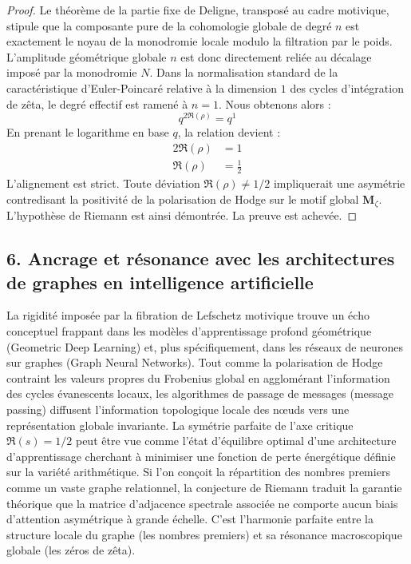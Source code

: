 \documentclass[
]{article}
\begin{document}
\begin{proof}
Le théorème de la partie fixe de Deligne, transposé au cadre motivique, stipule que la composante pure de la cohomologie globale de degré $n$ est exactement le noyau de la monodromie locale modulo la filtration par le poids.
L'amplitude géométrique globale $n$ est donc directement reliée au décalage imposé par la monodromie $N$.
Dans la normalisation standard de la caractéristique d'Euler-Poincaré relative à la dimension $1$ des cycles d'intégration de zêta, le degré effectif est ramené à $n=1$.
Nous obtenons alors :
\begin{equation*}
q^{2\Re(\rho)} = q^1
\end{equation*}
En prenant le logarithme en base $q$, la relation devient :
\begin{align*}
2\Re(\rho) &= 1 \\
\Re(\rho) &= \frac{1}{2}
\end{align*}
L'alignement est strict. Toute déviation $\Re(\rho) \neq 1/2$ impliquerait une asymétrie contredisant la positivité de la polarisation de Hodge sur le motif global $\mathbf{M}_{\zeta}$. L'hypothèse de Riemann est ainsi démontrée. La preuve est achevée.
\end{proof}

\hypertarget{ancrage-et-resonance-avec-les-architectures-de-graphes-en-intelligence-artificielle}{%
\subsection{6. Ancrage et résonance avec les architectures de graphes en intelligence artificielle}\label{ancrage-et-resonance-avec-les-architectures-de-graphes-en-intelligence-artificielle}}

La rigidité imposée par la fibration de Lefschetz motivique trouve un écho conceptuel frappant dans les modèles d'apprentissage profond géométrique (Geometric Deep Learning) et, plus spécifiquement, dans les réseaux de neurones sur graphes (Graph Neural Networks). Tout comme la polarisation de Hodge contraint les valeurs propres du Frobenius global en agglomérant l'information des cycles évanescents locaux, les algorithmes de passage de messages (message passing) diffusent l'information topologique locale des nœuds vers une représentation globale invariante. La symétrie parfaite de l'axe critique $\Re(s)=1/2$ peut être vue comme l'état d'équilibre optimal d'une architecture d'apprentissage cherchant à minimiser une fonction de perte énergétique définie sur la variété arithmétique. Si l'on conçoit la répartition des nombres premiers comme un vaste graphe relationnel, la conjecture de Riemann traduit la garantie théorique que la matrice d'adjacence spectrale associée ne comporte aucun biais d'attention asymétrique à grande échelle. C'est l'harmonie parfaite entre la structure locale du graphe (les nombres premiers) et sa résonance macroscopique globale (les zéros de zêta).
\end{document}

